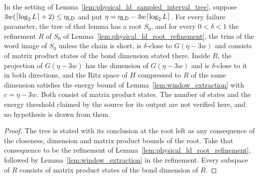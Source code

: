 \begin{lemma}
    \label{lem:low_density_tree_algorithm}
    \leanok
    In the setting of Lemma~\ref{lem:physical_ld_sampled_interval_tree},
    suppose $3w(\lceil\log_2L\rceil+2)\le\eta_{\rm LD}$ and put
    $\eta=\eta_{\rm LD}-3w\lceil\log_2L\rceil$. For every failure parameter,
    the tree of that lemma has a root $S_0$, and for every $0<\delta<1$ the
    refinement $R$ of $S_0$ of Lemma~\ref{lem:physical_ld_root_refinement},
    the trim of the word image of $S_0$ unless the chain is short, is
    $\delta$-close to $G(\eta-3w)$ and consists of matrix product states of
    the bond dimension stated there. Inside $R$, the projection of
    $G(\eta-3w)$ has the dimension of $G(\eta-3w)$ and is $\delta$-close to it
    in both directions, and the Ritz space of $H$ compressed to $R$ of the same
    dimension satisfies the energy bound of
    Lemma~\ref{lem:window_extraction} with $c=\eta-3w$. Both consist of matrix
    product states. The number of states and the energy threshold claimed by
    the source for its output are not verified here, and no hypothesis is
    drawn from them.
\end{lemma}
\begin{proof}\leanok
    The tree is stated with its conclusion at the root left as any
    consequence of the closeness, dimension and matrix product bounds of
    the root. Take that consequence to be the refinement of
    Lemma~\ref{lem:physical_ld_root_refinement}, followed by
    Lemma~\ref{lem:window_extraction} in the refinement. Every subspace of $R$
    consists of matrix product states of the bond dimension of $R$.
\end{proof}


